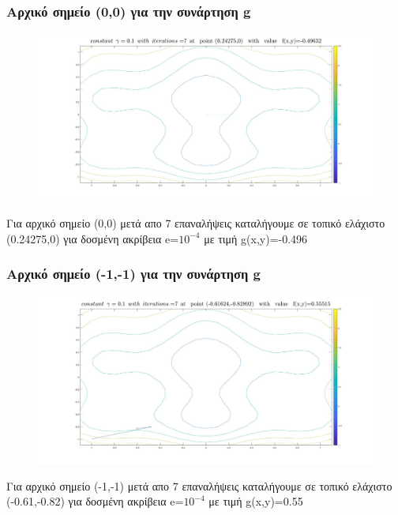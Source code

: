 \documentclass{article}
\begin{document}
\subsubsection*{Αρχικό σημείο (0,0) για την συνάρτηση g}
\begin{figure}[h!]	
     \centering  
     \advance\leftskip-0.2cm  
  \includegraphics[width=140mm,scale=2]{g1a.jpg}
\end{figure} 
Για αρχικό σημείο (0,0) μετά απο 7 επαναλήψεις καταλήγουμε σε τοπικό ελάχιστο (0.24275,0) για δοσμένη ακρίβεια e=$10^{-4}$ με τιμή g(x,y)=-0.496
\newpage 

\subsubsection*{Αρχικό σημείο (-1,-1) για την συνάρτηση g}
\begin{figure}[h!]	
     \centering  
     \advance\leftskip-0.2cm  
  \includegraphics[width=140mm,scale=2]{g1b.jpg}
\end{figure} 
Για αρχικό σημείο (-1,-1) μετά απο 7 επαναλήψεις καταλήγουμε σε τοπικό ελάχιστο (-0.61,-0.82) για δοσμένη ακρίβεια e=$10^{-4}$ με τιμή g(x,y)=0.55  
\end{document}
